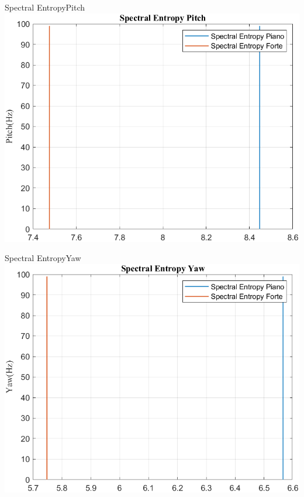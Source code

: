 \documentclass[beamer]{standalone}
\begin{document}
	\begin{frame}{{Spectral EntropyPitch}}
		\centering\includegraphics[height=.8\textheight]{figure/VAng/Trasformata/Spectral EntropyPitch}
	\end{frame}
	
	\begin{frame}{{Spectral EntropyYaw}}
		\centering\includegraphics[height=.8\textheight]{figure/VAng/Trasformata/Spectral EntropyYaw}
	\end{frame}
	
\end{document}

